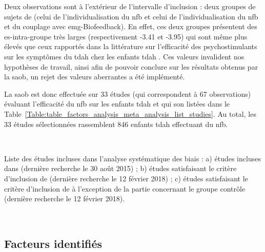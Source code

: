 Deux observations sont à l'extérieur de l'intervalle d'inclusion : deux groupes de sujets de \citet{Bazanova2018} (celui de l'individualisation du \gls{nfb} et 
celui de l'individualisation du \gls{nfb} et du couplage avec \gls{emg}-Biofeedback). En effet, ces deux groupes présentent des \gls{es}-intra-groupe très larges 
(respectivement -3.41 et -3.95) qui sont même plus élevés que ceux rapportés dans la littérature sur l'efficacité des psychostimulants sur les symptômes du 
\gls{tdah} chez les enfants \gls{tdah} \citep{Luan2017}. Ces valeurs invalident nos hypothèses de travail, ainsi afin de pouvoir conclure sur les résultats 
obtenus par la \gls{saob}, un rejet des valeurs aberrantes a été implémenté.

La \gls{saob} est donc effectuée sur 33 études (qui correspondent à 67 observations) évaluant l'efficacité du \gls{nfb} sur les enfants \gls{tdah} et qui son listées dans le 
Table~\ref{Table:table_factors_analysis_meta_analysis_list_studies}. Au total, les 33 études sélectionnées rassemblent 846 enfants \gls{tdah} effectuant du \gls{nfb}.

\newpage\
\begin{table}[h!]
  \centering
  \caption{Liste des études incluses dans l'analyse systématique des biais : a) études incluses dans \citet{Cortese2016}
	(dernière recherche le 30 août 2015) ; b) études satisfaisant le critère d'inclusion de \citet{Cortese2016} (dernière recherche le 12 février 2018) ; c) études 
	satisfaisant le critère d'inclusion de \citet{Cortese2016} à l'exception de la partie concernant le groupe contrôle (dernière recherche le 12 février 2018).}
  
  \label{Table:table_factors_analysis_meta_analysis_list_studies}
\end{table}

\newpage\
\subsection{Facteurs identifiés}

